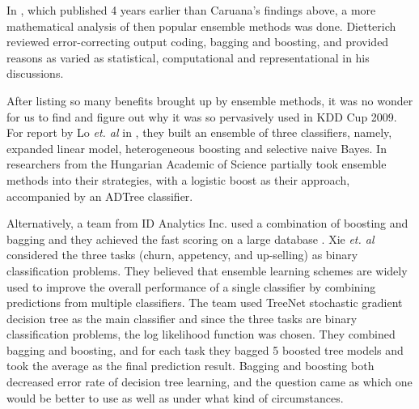 \documentclass[journal]{IEEEtran}
\begin{document}
\par
In \cite{Ref:EnsembleMethodsInMachineLearning}, which published 4 years earlier than Caruana's findings above, a more mathematical analysis of then popular ensemble methods was done. Dietterich reviewed error-correcting output coding, bagging and boosting, and provided reasons as varied as statistical, computational and representational in his discussions.
\par
After listing so many benefits brought up by ensemble methods, it was no wonder for us to find and figure out why it was so pervasively used in KDD Cup 2009. For report by Lo \emph{et. al} in \cite{Ref:AnEnsembleOfThreeClassifiersForKDD2009}, they built an ensemble of three classifiers, namely, expanded linear model, heterogeneous boosting and selective naive Bayes. In \cite{Ref:FeaturePartitioningAndBoosting} researchers from the Hungarian Academic of Science partially took ensemble methods into their strategies, with a logistic boost as their approach, accompanied by an ADTree classifier.
\par
Alternatively, a team from ID Analytics Inc. used a combination of boosting and bagging and they achieved the fast scoring on a large database \cite{Ref:ACombinationOfBoostingAndBaggingForKDD}. Xie \emph{et. al} considered the three tasks (churn, appetency, and up-selling) as binary classification problems. They believed that ensemble learning schemes are widely used to improve the overall performance of a single classifier by combining predictions from multiple classifiers. The team used TreeNet stochastic gradient decision tree as the main classifier and since the three tasks are binary classification problems, the log likelihood function was chosen. They combined bagging and boosting, and for each task they bagged 5 boosted tree models and took the average as the final prediction result. Bagging and boosting both decreased error rate of decision tree learning, and the question came as which one would be better to use as well as under what kind of circumstances.
\par
\end{document}
